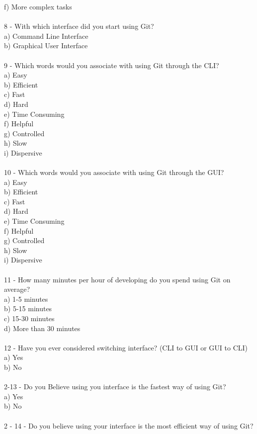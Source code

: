 \documentclass[]{report}
\begin{document}
	f) More complex tasks\\\\
	8 - With which interface did you start using Git?\\
	a) Command Line Interface\\
	b) Graphical User Interface\\\\
	9 - Which words would you associate with using Git through the CLI?\\
	a) Easy\\
	b) Efficient\\
	c) Fast\\
	d) Hard\\
	e) Time Consuming\\
	f) Helpful\\
	g) Controlled\\
	h) Slow\\
	i) Dispersive\\\\
	10 - Which words would you associate with using Git through the GUI?\\
	a) Easy\\
	b) Efficient\\
	c) Fast\\
	d) Hard\\
	e) Time Consuming\\
	f) Helpful\\
	g) Controlled\\
	h) Slow\\
	i) Dispersive\\\\
	11 - How many minutes per hour of developing do you spend using Git on average?\\
	a) 1-5 minutes\\
	b) 5-15 minutes\\
	c) 15-30 minutes\\
	d) More than 30 minutes\\\\
	12 - Have you ever considered switching interface? (CLI to GUI or GUI to CLI)\\
	a) Yes\\
	b) No\\\\
	2-13 - Do you Believe using you interface is the fastest way of using Git?\\
	a) Yes\\
	b) No\\\\
	2 - 14 - Do you believe using your interface is the most efficient way of using Git?\\
\end{document}
